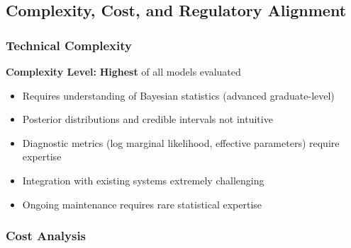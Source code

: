 \subsection{Complexity, Cost, and Regulatory Alignment}

\subsubsection{Technical Complexity}

\textbf{Complexity Level:} \textbf{Highest} of all models evaluated

\begin{itemize}
    \item Requires understanding of Bayesian statistics (advanced graduate-level)
    \item Posterior distributions and credible intervals not intuitive
    \item Diagnostic metrics (log marginal likelihood, effective parameters) require expertise
    \item Integration with existing systems extremely challenging
    \item Ongoing maintenance requires rare statistical expertise
\end{itemize}

\subsubsection{Cost Analysis}

